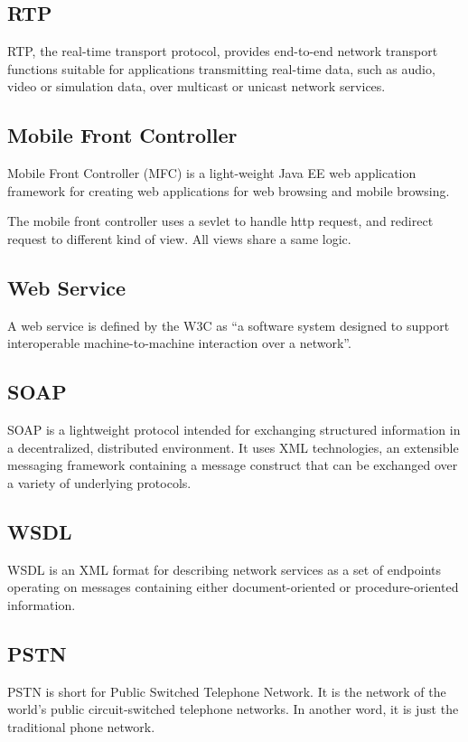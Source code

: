 \subsection*{RTP}
\label{sec:RTP}
\label{sym:RTP}

RTP, the real-time transport protocol, provides end-to-end network transport functions suitable for applications transmitting real-time data, such as audio, video or simulation data, over multicast or unicast network services.\cite{RFC3550}

\subsection*{Mobile Front Controller}
\label{sec:MobileFrontController}
\label{MFC}

Mobile Front Controller (MFC) is a light-weight Java EE web application framework for creating web applications for web browsing and mobile browsing. \cite{MobileFrontController}

The mobile front controller uses a sevlet to handle http request, and redirect request to different kind of view. All views share a same logic. 

\subsection*{Web Service}
\label{sec:WebService}

A web service is defined by the W3C as ``a software system designed to support interoperable machine-to-machine interaction over a network''.\cite{WebServicesGlossary}

\subsection*{SOAP}
\label{sec:SOAP}
\label{sym:SOAP}

SOAP is a lightweight protocol intended for exchanging structured information in a decentralized, distributed environment. It uses XML technologies, an extensible messaging framework containing a message construct that can be exchanged over a variety of underlying protocols.\cite{SOAPVersion1dot2}

\subsection*{WSDL}
\label{sec:WSDL}
\label{sym:WSDL}

WSDL is an XML format for describing network services as a set of endpoints operating on messages containing either document-oriented or procedure-oriented information.\cite{WSDL1dot1} 

\subsection*{PSTN}
\label{sym:PSTN} 
\label{sec:PSTN}

PSTN is short for Public Switched Telephone Network. It is the network of the world's public circuit-switched telephone networks. In another word, it is just the traditional phone network.
